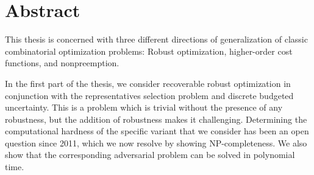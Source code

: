 \documentclass[twoside,openright,bibliography=totoc]{scrreprt}
\begin{document}











\printthesistitle

\printaffidavit



\chapter*{Abstract}
This thesis is concerned with three different directions of generalization of classic combinatorial optimization problems: Robust optimization, higher-order cost functions, and nonpreemption.

In the first part of the thesis, we consider recoverable robust optimization in conjunction with the representatives selection problem and discrete budgeted uncertainty. 
This is a problem which is trivial without the presence of any robustness, but the addition of robustness makes it challenging. 
Determining the computational hardness of the specific variant that we consider has been an open question since 2011, which we now resolve by showing NP-completeness. We also show that the corresponding adversarial problem can be solved in polynomial time.
\end{document}
